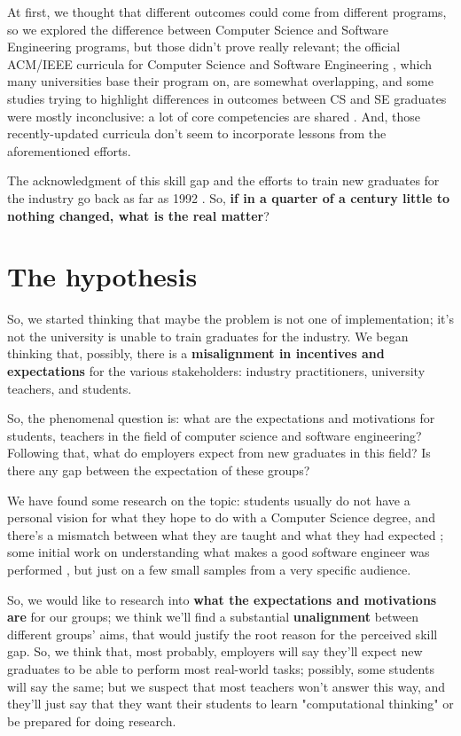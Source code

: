\documentclass{sigchi}
\begin{document}
At first, we thought that different outcomes could come from different programs, so we explored the difference between Computer Science and Software Engineering programs, but those didn't prove really relevant; the official ACM/IEEE curricula for Computer Science \cite{Force2013} and Software Engineering \cite{Ardis2015}, which many universities base their program on, are somewhat overlapping, and some studies trying to highlight differences in outcomes between CS and SE graduates were mostly inconclusive: a lot of core competencies are shared \cite{Meziane2004} \cite{Rasool2014}. And, those recently-updated curricula don't seem to incorporate lessons from the aforementioned efforts.

The acknowledgment of this skill gap and the efforts to train new graduates for the industry go back as far as 1992 \cite{Dawson1992}. So, \textbf{if in a quarter of a century little to nothing changed, what is the real matter}?

\section{The hypothesis}
So, we started thinking that maybe the problem is not one of implementation; it's not the university is unable to train graduates for the industry. We began thinking that, possibly, there is a \textbf{misalignment in incentives and expectations} for the various stakeholders: industry practitioners, university teachers, and students.

 So, the phenomenal question is: what are the expectations and motivations for students, teachers in the field of computer science and software engineering? Following that, what do employers expect from new graduates in this field? Is there any gap between the expectation of these groups?
 
 We have found some research on the topic: students usually do not have a personal vision for what they hope to do with a Computer Science degree, and there's a mismatch between what they are taught and what they had expected \cite{Hewner2011}; some initial work on understanding what makes a good software engineer was performed \cite{Li2015}, but just on a few small samples from a very specific audience.
 
 So, we would like to research into \textbf{what the expectations and motivations are} for our groups; we think we'll find a substantial \textbf{unalignment} between different groups' aims, that would justify the root reason for the perceived skill gap. So, we think that, most probably, employers will say they'll expect new graduates to be able to perform most real-world tasks; possibly, some students will say the same; but we suspect that most teachers won't answer this way, and they'll just say that they want their students to learn "computational thinking" or be prepared for doing research.
 
\end{document}
